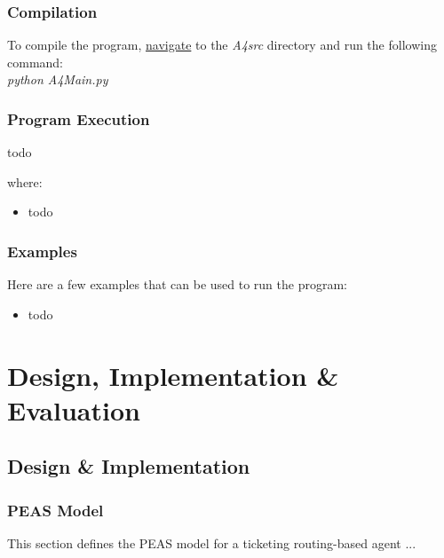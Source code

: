 \documentclass[letterpaper,12pt]{article}
\begin{document}
\subsubsection{Compilation}

To compile the program, \underline{navigate} to the \textit{A4src} directory and run the following command:\\

\textit{python A4Main.py}

\subsubsection{Program Execution}

todo

where:

\begin{itemize}
    \item todo
\end{itemize}

\subsubsection{Examples}

Here are a few examples that can be used to run the program:

\begin{itemize}
    \item todo
\end{itemize}


\section{Design, Implementation \& Evaluation}
\label{sec:design-implementation-evaluation}

\subsection{Design \& Implementation}


\subsubsection{PEAS Model}

This section defines the PEAS model for a ticketing routing-based agent ...
\end{document}
